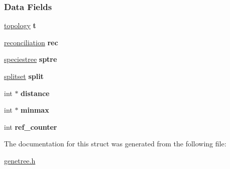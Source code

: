 \subsubsection*{Data Fields}
\begin{DoxyCompactItemize}
\item 
\mbox{\label{structgenetree__struct_a477c44458400654d11a902f30c616321}} 
\hyperlink{structtopology__struct}{topology} {\bfseries t}
\item 
\mbox{\label{structgenetree__struct_a5ba29537e6c9bfb52d69972ab49c9eec}} 
\hyperlink{structreconciliation__struct}{reconciliation} {\bfseries rec}
\item 
\mbox{\label{structgenetree__struct_a63fa84e43aad1603d40dbd37607f66c5}} 
\hyperlink{structspeciestree__struct}{speciestree} {\bfseries sptre}
\item 
\mbox{\label{structgenetree__struct_a29675629bba123ceffd2d8d54402daad}} 
\hyperlink{structsplitset__struct}{splitset} {\bfseries split}
\item 
\mbox{\label{structgenetree__struct_abd848a8e8ef0f0bb13aa96f241e87234}} 
int $\ast$ {\bfseries distance}
\item 
\mbox{\label{structgenetree__struct_a5d9db824b8191c0c694900d6670b8bf1}} 
int $\ast$ {\bfseries minmax}
\item 
\mbox{\label{structgenetree__struct_ac996ed5df3cfb4987d10182d342abce8}} 
int {\bfseries ref\+\_\+counter}
\end{DoxyCompactItemize}


The documentation for this struct was generated from the following file\+:\begin{DoxyCompactItemize}
\item 
\hyperlink{genetree_8h}{genetree.\+h}\end{DoxyCompactItemize}
